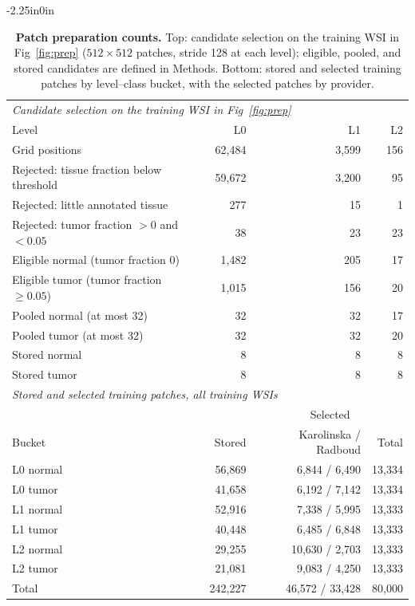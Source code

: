 \documentclass[10pt,letterpaper]{article}
\begin{document}
\begin{table}[H]\begin{adjustwidth}{-2.25in}{0in}\centering
\caption{\textbf{Patch preparation counts.} Top: candidate selection on the training WSI in Fig~\ref{fig:prep} ($512\times512$ patches, stride 128 at each level); eligible, pooled, and stored candidates are defined in Methods. Bottom: stored and selected training patches by level--class bucket, with the selected patches by provider.}\label{tab:prep}
\begin{tabular}{lrrr}\toprule
\multicolumn{4}{l}{\textit{Candidate selection on the training WSI in Fig~\ref{fig:prep}}}\\
Level & L0 & L1 & L2\\\midrule
Grid positions & 62,484 & 3,599 & 156\\
Rejected: tissue fraction below threshold & 59,672 & 3,200 & 95\\
Rejected: little annotated tissue & 277 & 15 & 1\\
Rejected: tumor fraction $>0$ and $<0.05$ & 38 & 23 & 23\\
Eligible normal (tumor fraction 0) & 1,482 & 205 & 17\\
Eligible tumor (tumor fraction $\geq0.05$) & 1,015 & 156 & 20\\
Pooled normal (at most 32) & 32 & 32 & 17\\
Pooled tumor (at most 32) & 32 & 32 & 20\\
Stored normal & 8 & 8 & 8\\
Stored tumor & 8 & 8 & 8\\
\midrule
\multicolumn{4}{l}{\textit{Stored and selected training patches, all training WSIs}}\\
& & \multicolumn{2}{c}{Selected}\\
Bucket & Stored & Karolinska / Radboud & Total\\\midrule
L0 normal & 56,869 & 6,844 / 6,490 & 13,334\\
L0 tumor & 41,658 & 6,192 / 7,142 & 13,334\\
L1 normal & 52,916 & 7,338 / 5,995 & 13,333\\
L1 tumor & 40,448 & 6,485 / 6,848 & 13,333\\
L2 normal & 29,255 & 10,630 / 2,703 & 13,333\\
L2 tumor & 21,081 & 9,083 / 4,250 & 13,333\\
Total & 242,227 & 46,572 / 33,428 & 80,000\\
\bottomrule
\end{tabular}\end{adjustwidth}\end{table}
\end{document}
